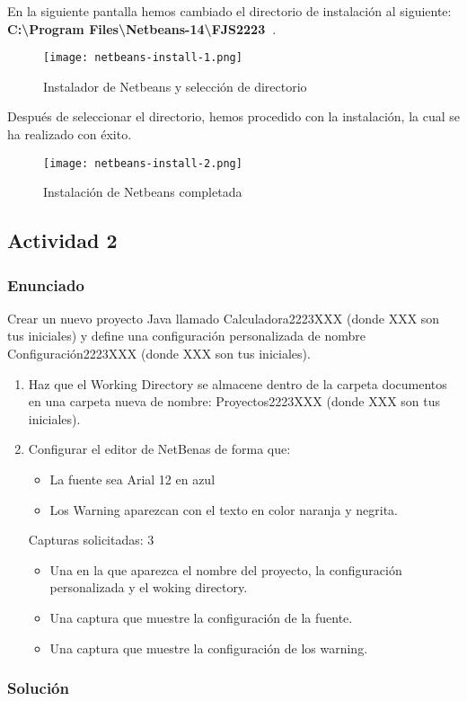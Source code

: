 \begin{enumerate}[label=(\alph*)]
     En la siguiente pantalla hemos cambiado el directorio de instalación al siguiente: \textbf{C:\textbackslash Program Files\textbackslash Netbeans-14\textbackslash FJS2223\ }.

    \begin{figure}[ht]
        \centering
        \texttt{[image: netbeans-install-1.png]}
        \caption{Instalador de Netbeans y selección de directorio}
    \end{figure}

    Después de seleccionar el directorio, hemos procedido con la instalación, la cual se ha realizado con éxito.

    \begin{figure}[ht]
        \centering
        \texttt{[image: netbeans-install-2.png]}
        \caption{Instalación de Netbeans completada}
    \end{figure}
\end{enumerate}

\subsection{Actividad 2}
\subsubsection{Enunciado}
Crear un nuevo proyecto Java llamado Calculadora2223XXX (donde XXX son tus iniciales) y define una configuración personalizada de nombre Configuración2223XXX (donde XXX son tus iniciales).

\begin{enumerate}[label=(\alph*)]
    \item Haz que el Working Directory se almacene dentro de la carpeta documentos en una carpeta nueva de nombre: Proyectos2223XXX (donde XXX son tus iniciales).

    \item Configurar el editor de NetBenas de forma que:
    \begin{itemize}
        \item La fuente sea Arial 12 en azul
        \item Los Warning aparezcan con el texto en color naranja y negrita.
    \end{itemize}

    Capturas solicitadas: 3
    \begin{itemize}
        \item Una en la que aparezca el nombre del proyecto, la configuración personalizada y el woking directory.
        \item Una captura que muestre la configuración de la fuente.
        \item Una captura que muestre la configuración de los warning.
    \end{itemize}
\end{enumerate}

\subsubsection{Solución}









\newpage



